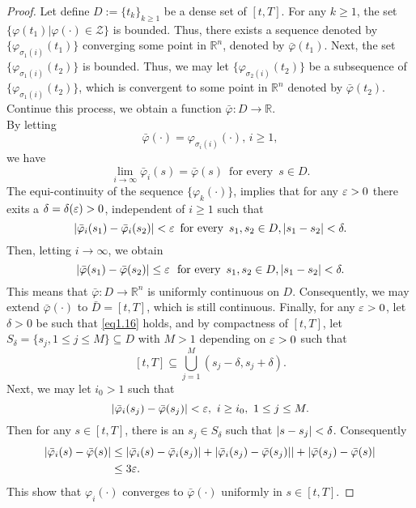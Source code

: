     \begin{proof}
        Let define $D:=\{t_k\}_{k\geq 1}$ be a dense set of $[t,T]$. For any $k\geq 1$,
        the set $ \{\varphi(t_1)|\varphi(\cdot)\in \mathcal{Z}\} $ is bounded. Thus, 
        there exists a sequence denoted by $\{\varphi_{\sigma_1(i)}(t_1)\}$ converging
        some point in $\mathbb{R}^n$, denoted by $\bar{\varphi}(t_1)$. Next, the set
        $\{\varphi_{\sigma_1(i)}(t_2)\}$ is bounded. Thus, we may let  
        $\{\varphi_{\sigma_2(i)}(t_2)\}$ be a subsequence of
        $\{\varphi_{\sigma_1(i)}(t_2)\}$, which is convergent to some point in 
        $\mathbb{R}^n$ denoted by $\bar{\varphi}(t_2)$. Continue this process, we obtain a
        function $\bar{\varphi}:D\to \mathbb{R}$. \\
        By letting 
        $$
            \bar{\varphi}(\cdot)=\varphi_{\sigma_i(i)}(\cdot),\, i\geq 1,
        $$
        we have 
        $$
            \lim_{i\to \infty} \bar{\varphi}_i(s)=\bar{\varphi}(s)\,\mbox{ for every }\, %
            s\in D.
        $$
        The equi-continuity of the sequence $\{\varphi_k(\cdot)\}$, implies that for any 
        $\varepsilon>0$ there exits a $\delta=\delta(\varepsilon)>0$, independent of $i\geq 1$ such that
        \begin{equation}\label{eq1.16}
        	\abs{\bar{\varphi}_i(s_1) - \bar{\varphi}_i(s_2)} < \veps\, \mbox{ for every } %
        	\, s_1, s_2 \in D, \abs{s_1-s_2} < \delta.
        \end{equation}
        Then, letting $ i \to \infty$, we obtain
        $$
            \abs{\bar{\varphi}(s_1)-\bar{\varphi}(s_2)} \leq \veps \, \, \mbox{ for every }%
            \, s_1,s_2\in D, \abs{s_1-s_2} < \delta.
        $$
        This means that $\bar{\varphi}:D\to \mathbb{R}^n$ is uniformly continuous on $D$.
        Consequently, we may extend $\bar{\varphi}(\cdot)$ to $\bar{D} = [t,T]$, which is
        still continuous. Finally, for any $\varepsilon > 0$, let $\delta > 0$ be such that 
        \cref{eq1.16} holds, and by compactness of $[t,T]$, let 
        $S_{\delta} = \{s_j,1 \leq j\leq M\}\subseteq D$ with $M > 1$ depending on 
        $\varepsilon > 0$ such that
        $$
            [t,T]\subseteq \bigcup^M_{j = 1}(s_j - \delta, s_j + \delta).
        $$
        Next, we may let $i_0 > 1$ such that
        $$
        	\abs{\bar{\varphi}_i(s_j) - \bar{\varphi}(s_j)}<\veps, \, \, i\geq i_0, \, \, %
        	1\leq j\leq M.
        $$
        Then for any $s\in [t,T]$, there is an $s_j\in S_{\delta}$ such that 
        $\left\lvert s - s_j\right\rvert <\delta$. Consequently
        \begin{align*}
            \abs{\bar{\varphi}_i(s)-\bar{\varphi}(s)} &\leq %
                \abs{\bar{\varphi}_i(s)-\bar{\varphi}_i(s_j)} + %
                \abs{\bar{\varphi}_i(s_j)-\bar{\varphi}(s_j)|} + %
                \abs{\bar{\varphi}(s_j)-\bar{\varphi}(s)} \\
                &\leq 3\veps.
        \end{align*}
        This show that $\varphi_i(\cdot)$ converges to $\bar{\varphi}(\cdot)$ uniformly 
        in $s\in [t,T]$.
    \end{proof}
